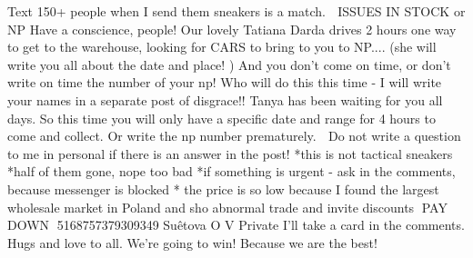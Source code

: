 Text 150+ people when I send them sneakers is a match.
🔴 ISSUES IN STOCK or NP
Have a conscience, people!
Our lovely Tatiana Darda drives 2 hours one way to get to the warehouse, looking for CARS to bring to you to NP.... (she will write you all about the date and place! )
And you don't come on time, or don't write on time the number of your np!
Who will do this this time - I will write your names in a separate post of disgrace!!
Tanya has been waiting for you all days.
So this time you will only have a specific date and range for 4 hours to come and collect. Or write the np number prematurely.
🔴 Do not write a question to me in personal if there is an answer in the post!
*this is not tactical sneakers
*half of them gone, nope too bad
*if something is urgent - ask in the comments, because messenger is blocked
* the price is so low because I found the largest wholesale market in Poland and sho abnormal trade and invite discounts
🔴PAY DOWN🔴
5168757379309349 Suêtova O V Private
I'll take a card in the comments.
Hugs and love to all.
We're going to win!
Because we are the best!
💙💛
